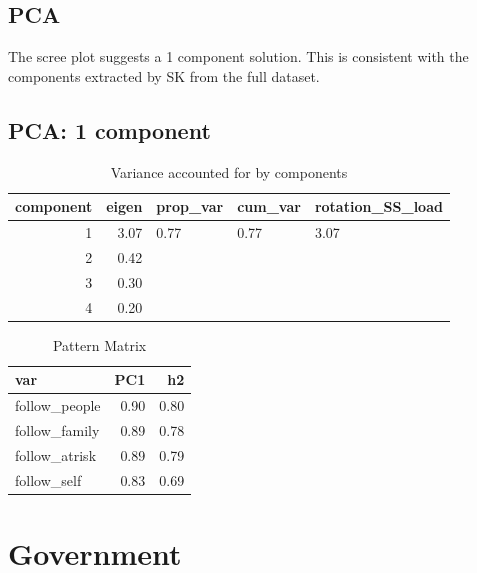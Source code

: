 \documentclass[]{article}
\begin{document}
\hypertarget{pca-1}{%
\subsection{PCA}\label{pca-1}}

The scree plot suggests a 1 component solution. This is consistent with
the components extracted by SK from the full dataset.

\hypertarget{pca-1-component-2}{%
\subsection{PCA: 1 component}\label{pca-1-component-2}}

\begin{table}[H]

\caption{\label{tab:unnamed-chunk-31}Variance accounted for by components}
\centering
\fontsize{6}{8}\selectfont
\begin{tabular}[t]{rrlll}
\toprule
component & eigen & prop\_var & cum\_var & rotation\_SS\_load\\
\midrule
1 & 3.07 & 0.77 & 0.77 & 3.07\\
2 & 0.42 &  &  & \\
3 & 0.30 &  &  & \\
4 & 0.20 &  &  & \\
\bottomrule
\end{tabular}
\end{table}

\begin{table}[H]

\caption{\label{tab:unnamed-chunk-31}Pattern Matrix}
\centering
\fontsize{6}{8}\selectfont
\begin{tabular}[t]{lrr}
\toprule
var & PC1 & h2\\
\midrule
follow\_people & 0.90 & 0.80\\
follow\_family & 0.89 & 0.78\\
follow\_atrisk & 0.89 & 0.79\\
follow\_self & 0.83 & 0.69\\
\bottomrule
\end{tabular}
\end{table}

\newpage

\hypertarget{government}{%
\section{Government}\label{government}}
\end{document}

